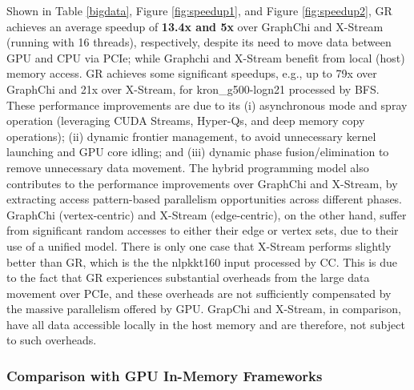 Shown in Table \ref{bigdata}, Figure \ref{fig:speedup1}, and Figure \ref{fig:speedup2}, GR achieves an average speedup of 
{\bf 13.4x and 5x} over GraphChi and X-Stream (running with 16 threads), respectively, despite its need to move data
between GPU and CPU via PCIe; while Graphchi and X-Stream benefit from local (host) memory access. GR achieves some significant speedups, 
e.g., up to 79x over GraphChi and 21x over X-Stream, for kron\_g500-logn21 processed by BFS. These performance improvements are due to
its (i) asynchronous mode and spray operation (leveraging CUDA Streams, Hyper-Qs, and deep memory copy operations); 
(ii) dynamic frontier management, to avoid unnecessary kernel launching and GPU core idling; and (iii) dynamic phase fusion/elimination 
to remove unnecessary data movement. The
hybrid programming model also contributes to the performance improvements over GraphChi and X-Stream, by extracting access pattern-based parallelism opportunities across different phases. GraphChi (vertex-centric) 
and X-Stream (edge-centric), on the other hand, suffer from significant random accesses to either their edge or vertex sets, 
due to their use of a unified model. There is only one case that X-Stream performs slightly better than GR, which is the the nlpkkt160 
input processed by CC. This is due to the fact that GR experiences substantial overheads from the large data movement over PCIe, and these overheads
are not sufficiently compensated by the massive parallelism offered by GPU. GrapChi and X-Stream, in comparison, have all data accessible
locally in the host memory and are therefore, not subject to such overheads. 




\subsubsection{Comparison with GPU In-Memory Frameworks}


